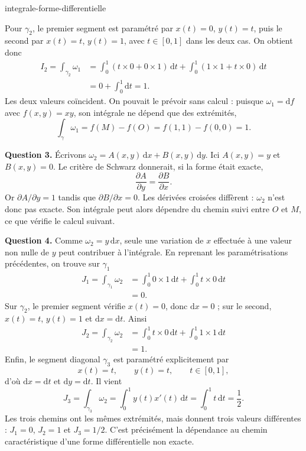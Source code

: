 \begin{exo}{integrale-forme-differentielle}
\begin{solution}
Pour $\gamma_2$, le premier segment est paramétré par $x(t)=0$, $y(t)=t$,
puis le second par $x(t)=t$, $y(t)=1$, avec $t\in[0,1]$ dans les deux cas.
On obtient donc
\[
\begin{aligned}
I_2
= \int_{\gamma_2}\omega_1
&= \int_0^1\left(t\times 0+0\times 1\right)\,\mathrm{d}t
 + \int_0^1\left(1\times 1+t\times 0\right)\,\mathrm{d}t \\
&= 0+\int_0^1\mathrm{d}t = 1.
\end{aligned}
\]
Les deux valeurs coïncident. On pouvait le prévoir sans calcul : puisque
$\omega_1=\mathrm{d}f$ avec $f(x,y)=xy$, son intégrale ne dépend que des
extrémités,
\[
\int_\gamma\omega_1=f(M)-f(O)=f(1,1)-f(0,0)=1.
\]

\textbf{Question 3.} Écrivons $\omega_2=A(x,y)\,\mathrm{d}x+B(x,y)\,\mathrm{d}y$.
Ici $A(x,y)=y$ et $B(x,y)=0$. Le critère de Schwarz donnerait, si la forme
était exacte,
\[
\frac{\partial A}{\partial y}=\frac{\partial B}{\partial x}.
\]
Or $\partial A/\partial y=1$ tandis que $\partial B/\partial x=0$. Les
dérivées croisées diffèrent : $\omega_2$ n'est donc pas exacte. Son intégrale
peut alors dépendre du chemin suivi entre $O$ et $M$, ce que vérifie le calcul
suivant.

\textbf{Question 4.} Comme $\omega_2=y\,\mathrm{d}x$, seule une variation de
$x$ effectuée à une valeur non nulle de $y$ peut contribuer à l'intégrale.
En reprenant les paramétrisations précédentes, on trouve sur $\gamma_1$
\[
\begin{aligned}
J_1
=\int_{\gamma_1}\omega_2
&=\int_0^1 0\times 1\,\mathrm{d}t
  +\int_0^1 t\times 0\,\mathrm{d}t \\
&=0.
\end{aligned}
\]
Sur $\gamma_2$, le premier segment vérifie $x(t)=0$, donc
$\mathrm{d}x=0$ ; sur le second, $x(t)=t$, $y(t)=1$ et
$\mathrm{d}x=\mathrm{d}t$. Ainsi
\[
\begin{aligned}
J_2
=\int_{\gamma_2}\omega_2
&=\int_0^1 t\times 0\,\mathrm{d}t
  +\int_0^1 1\times 1\,\mathrm{d}t \\
&=1.
\end{aligned}
\]
Enfin, le segment diagonal $\gamma_3$ est paramétré explicitement par
\[
x(t)=t,\qquad y(t)=t,\qquad t\in[0,1],
\]
d'où $\mathrm{d}x=\mathrm{d}t$ et $\mathrm{d}y=\mathrm{d}t$. Il vient
\[
J_3
=\int_{\gamma_3}\omega_2
=\int_0^1 y(t)x'(t)\,\mathrm{d}t
=\int_0^1 t\,\mathrm{d}t
=\frac12.
\]
Les trois chemins ont les mêmes extrémités, mais donnent trois valeurs
différentes : $J_1=0$, $J_2=1$ et $J_3=1/2$. C'est précisément la dépendance
au chemin caractéristique d'une forme différentielle non exacte.
\end{solution}
\end{exo}

